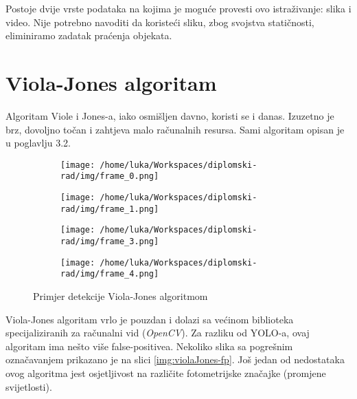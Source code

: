 Postoje dvije vrste podataka na kojima je moguće provesti ovo istraživanje: slika i video. Nije potrebno navoditi da koristeći sliku, zbog svojstva statičnosti, eliminiramo zadatak praćenja objekata.

\section{Viola-Jones algoritam}

Algoritam Viole i Jones-a, iako osmišljen davno, koristi se i danas. Izuzetno je brz, dovoljno točan i zahtjeva malo računalnih resursa. Sami algoritam opisan je u poglavlju 3.2. 

\begin{figure}[htp]
	\centering
	\begin{subfigure}[b]{0.4\linewidth}
		\texttt{[image: /home/luka/Workspaces/diplomski-rad/img/frame\_0.png]}
	\end{subfigure}
	\begin{subfigure}[b]{0.4\linewidth}
		\texttt{[image: /home/luka/Workspaces/diplomski-rad/img/frame\_1.png]}
	\end{subfigure}
	\begin{subfigure}[b]{0.4\linewidth}
		\texttt{[image: /home/luka/Workspaces/diplomski-rad/img/frame\_3.png]}
	\end{subfigure}
	\begin{subfigure}[b]{0.4\linewidth}
		\texttt{[image: /home/luka/Workspaces/diplomski-rad/img/frame\_4.png]}
	\end{subfigure}
	\caption{Primjer detekcije Viola-Jones algoritmom}
	\label{img:violaJones-detection}
\end{figure}

Viola-Jones algoritam vrlo je pouzdan i dolazi sa većinom biblioteka specijaliziranih za računalni vid (\textit{OpenCV}). Za razliku od YOLO-a, ovaj algoritam ima nešto više false-positivea. Nekoliko slika sa pogrešnim označavanjem prikazano je na slici \ref{img:violaJones-fp}. Još jedan od nedostataka ovog algoritma jest osjetljivost na različite fotometrijske značajke (promjene svijetlosti). 

